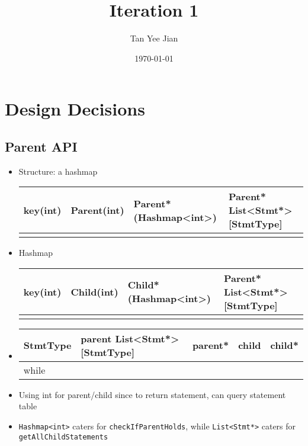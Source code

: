 \documentclass[11pt]{article}
\author{Tan Yee Jian}
\date{\today}
\title{Iteration 1}
\begin{document}
\maketitle
\tableofcontents

\section{Design Decisions}
\label{sec:orgf1c65ee}
\subsection{Parent API}
\label{sec:org647e0d9}
\begin{itemize}
\item Structure: a hashmap
\begin{center}
\begin{tabular}{llll}
key(int) & Parent(int) & Parent*(Hashmap<int>) & Parent* List<Stmt*>[StmtType]\\
\hline
 &  &  & \\
\end{tabular}
\end{center}
\item Hashmap
\begin{center}
\begin{tabular}{llll}
key(int) & Child(int) & Child*(Hashmap<int>) & Parent* List<Stmt*>[StmtType]\\
\hline
 &  &  & \\
\end{tabular}
\end{center}
\item \begin{center}
\begin{tabular}{lllll}
StmtType & parent List<Stmt*>[StmtType] & parent* & child & child*\\
\hline
while &  &  &  & \\
\end{tabular}
\end{center}
\item Using int for parent/child since to return statement, can query statement table
\item \texttt{Hashmap<int>} caters for \texttt{checkIfParentHolds}, while \texttt{List<Stmt*>} caters for
\texttt{getAllChildStatements}
\end{itemize}
\end{document}
